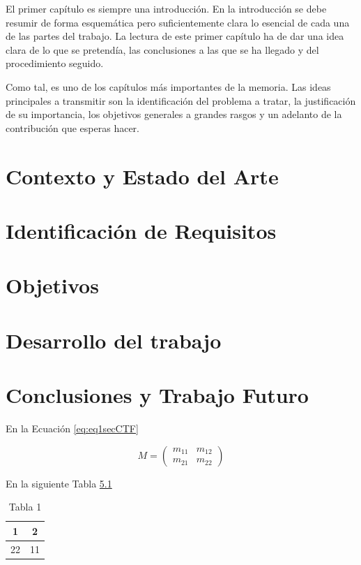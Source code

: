 \documentclass[11pt,a4paper,spanish]{book}
\numberwithin{equation}{chapter}
\numberwithin{figure}{chapter}
\begin{document}
El primer capítulo es siempre una introducción. En la introducción se debe resumir de forma esquemática pero suficientemente clara lo esencial de cada una de las partes del trabajo. La lectura de este primer capítulo ha de dar una idea clara de lo que se pretendía, las conclusiones a las que se ha llegado y del procedimiento seguido.

Como tal, es uno de los capítulos más importantes de la memoria. Las ideas principales a transmitir son la identificación del problema a tratar, la justificación de su importancia, los objetivos generales a grandes rasgos y un adelanto de la contribución que esperas hacer.



\chapter{Contexto y Estado del Arte}

\chapter{Identificación de Requisitos}

\chapter{Objetivos}

\chapter{Desarrollo del trabajo}

\chapter{Conclusiones y Trabajo Futuro}

En la Ecuación \eqref{eq:eq1secCTF}


\begin{equation}\label{eq:eq1secCTF}
M=\begin{pmatrix}
	m_{11}&m_{12}\\
	m_{21}&m_{22}
\end{pmatrix}
\end{equation}

En la siguiente Tabla \ref{tab:tab1secCTF}

\begin{table}[h]
\centering
\begin{tabular}{|c|c|}
	\hline
	1 & 2 \\
	\hline
	22 & 11 \\
	\hline
\end{tabular}
\caption{Tabla 1}
\label{tab:tab1secCTF}
\end{table}
\end{document}
